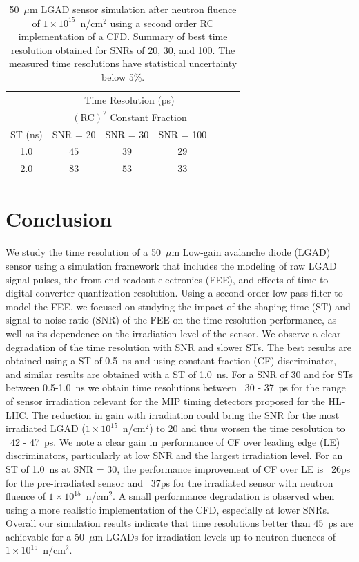 \documentclass[preprint,1p]{elsarticle}
\begin{document}
 \begin{table}
    \begin{center}
     \begin{tabular}{c|ccc|ccc}
     \multicolumn{1}{c}{}& \multicolumn{3}{c}{Time Resolution (ps)} \\
     \multicolumn{1}{c}{}& \multicolumn{3}{c}{$\mathrm{(RC)}^{2}$ Constant Fraction}\\ \hline
     ST (ns) & SNR = 20      & SNR = 30      & SNR = 100 \\
     1.0 & $45$  & $ 39$  & $29$ \\
     2.0 & $83$  & $ 53$  & $33$ \\
     \end{tabular}
     \end{center}
     \caption{50~$\mu$m LGAD sensor simulation after neutron fluence of
      $1\times 10^{15}$~n/cm$^2$ using a second order RC implementation of a CFD.
      Summary of best time resolution obtained for SNRs
     of 20, 30, and 100. The measured time resolutions
    have statistical uncertainty below 5\%. }
\label{tab:shaping_time_1e15_psCFD}
  \end{table}


\section{Conclusion}\label{sec:conclusion}

We study the time resolution of a 50~$\mu$m Low-gain avalanche diode (LGAD)
sensor using a simulation framework that includes the
modeling of raw LGAD signal pulses, the front-end readout electronics (FEE), and effects of
time-to-digital converter quantization resolution.
Using a second order low-pass filter to model the FEE,
we focused on studying the impact of the shaping time (ST) and signal-to-noise ratio (SNR) of the FEE
on the time resolution performance, as well as its dependence on the irradiation level of the sensor.
We observe a clear degradation of the time resolution with SNR and slower STs. The best results are
obtained using a ST of 0.5~\si{ns} and using constant fraction (CF) discriminator, and similar
results are obtained with a ST of 1.0~\si{ns}. For a SNR of 30 and for STs between 0.5-1.0~\si{ns} we
obtain time resolutions between ~30 - 37~\si{ps} for the range of sensor irradiation relevant for the MIP timing detectors
proposed for the HL-LHC. The reduction in gain with irradiation could bring the SNR for the most irradiated
LGAD ($1\times 10^{15}$~n/cm$^2$) to 20 and thus worsen the time resolution to ~42 - 47~\si{ps}.
We note a clear gain in performance of CF over leading edge (LE) discriminators, particularly at
low SNR and the largest irradiation level. For an ST of 1.0~\si{ns} at SNR = 30, the performance improvement of
CF over LE is ~26\si{ps} for the pre-irradiated sensor and ~37\si{ps} for the irradiated sensor with neutron fluence of
$1\times 10^{15}$~n/cm$^2$. A small performance degradation is observed when using a more
realistic implementation of the CFD, especially at lower SNRs. Overall our simulation results indicate that
time resolutions better than 45~\si{ps} are achievable for a 50~$\mu$m LGADs for irradiation levels up
to neutron fluences of $1\times 10^{15}$~n/cm$^2$.
\end{document}
